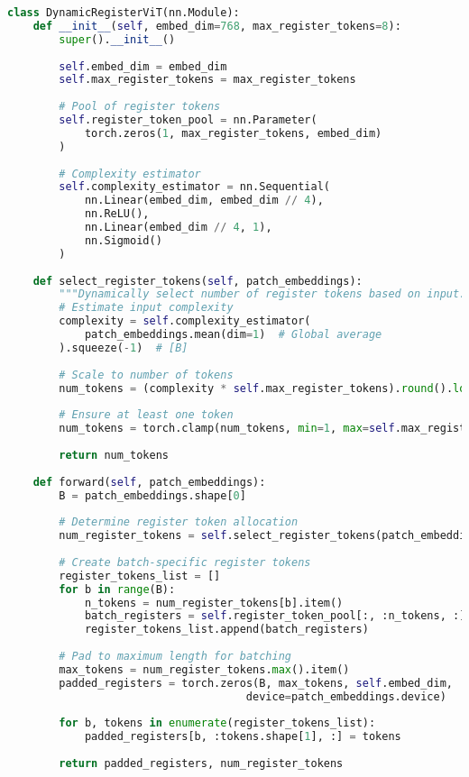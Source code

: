 \begin{lstlisting}[language=Python, caption=Dynamic register token allocation]
class DynamicRegisterViT(nn.Module):
    def __init__(self, embed_dim=768, max_register_tokens=8):
        super().__init__()
        
        self.embed_dim = embed_dim
        self.max_register_tokens = max_register_tokens
        
        # Pool of register tokens
        self.register_token_pool = nn.Parameter(
            torch.zeros(1, max_register_tokens, embed_dim)
        )
        
        # Complexity estimator
        self.complexity_estimator = nn.Sequential(
            nn.Linear(embed_dim, embed_dim // 4),
            nn.ReLU(),
            nn.Linear(embed_dim // 4, 1),
            nn.Sigmoid()
        )
    
    def select_register_tokens(self, patch_embeddings):
        """Dynamically select number of register tokens based on input."""
        # Estimate input complexity
        complexity = self.complexity_estimator(
            patch_embeddings.mean(dim=1)  # Global average
        ).squeeze(-1)  # [B]
        
        # Scale to number of tokens
        num_tokens = (complexity * self.max_register_tokens).round().long()
        
        # Ensure at least one token
        num_tokens = torch.clamp(num_tokens, min=1, max=self.max_register_tokens)
        
        return num_tokens
    
    def forward(self, patch_embeddings):
        B = patch_embeddings.shape[0]
        
        # Determine register token allocation
        num_register_tokens = self.select_register_tokens(patch_embeddings)
        
        # Create batch-specific register tokens
        register_tokens_list = []
        for b in range(B):
            n_tokens = num_register_tokens[b].item()
            batch_registers = self.register_token_pool[:, :n_tokens, :].expand(1, -1, -1)
            register_tokens_list.append(batch_registers)
        
        # Pad to maximum length for batching
        max_tokens = num_register_tokens.max().item()
        padded_registers = torch.zeros(B, max_tokens, self.embed_dim, 
                                     device=patch_embeddings.device)
        
        for b, tokens in enumerate(register_tokens_list):
            padded_registers[b, :tokens.shape[1], :] = tokens
        
        return padded_registers, num_register_tokens
\end{lstlisting}

